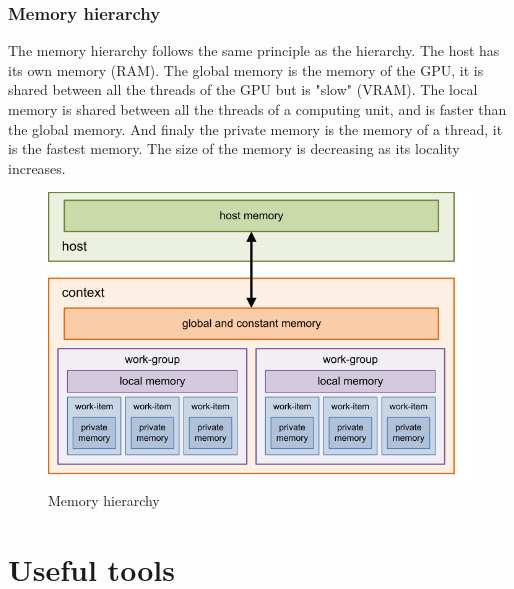 \documentclass[12pt, openany]{report}
\theoremstyle{definition}
\begin{document}
\subsection{Memory hierarchy}
The memory hierarchy follows the same principle as the hierarchy. The host has its own memory (RAM). The global memory is the memory of the GPU, it is shared between all the threads of the GPU but is "slow" (VRAM). The local memory is shared between all the threads of a computing unit, and is faster than the global memory. And finaly the private memory is the memory of a thread, it is the fastest memory. The size of the memory is decreasing as its locality increases.\\
\begin{figure}[H]
	\centering
	\includegraphics[width=0.8\linewidth]{img/mem_GPU.png}
	\caption{Memory hierarchy}
	\label{fig:mem_GPU}
\end{figure}
\chapter{Useful tools}
\end{document}
